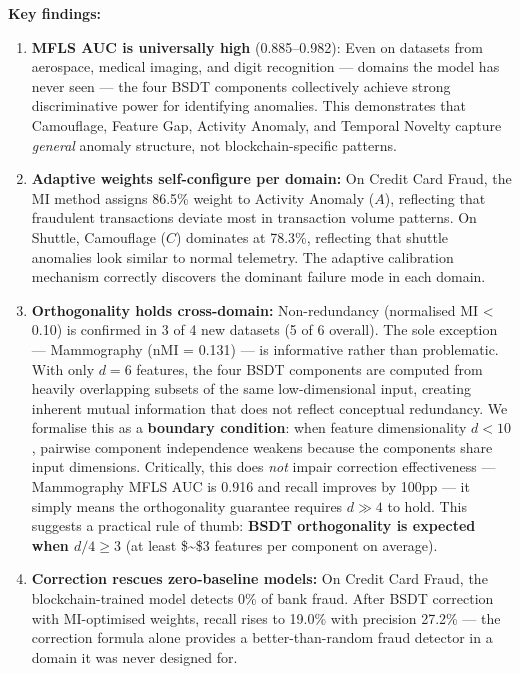 \documentclass[
  11pt,
]{article}
\begin{document}
\textbf{Key findings:}

\begin{enumerate}
\def\labelenumi{\arabic{enumi}.}
\item
  \textbf{MFLS AUC is universally high} (0.885–0.982): Even on datasets
  from aerospace, medical imaging, and digit recognition — domains the
  model has never seen — the four BSDT components collectively achieve
  strong discriminative power for identifying anomalies. This
  demonstrates that Camouflage, Feature Gap, Activity Anomaly, and
  Temporal Novelty capture \emph{general} anomaly structure, not
  blockchain-specific patterns.
\item
  \textbf{Adaptive weights self-configure per domain:} On Credit Card
  Fraud, the MI method assigns 86.5\% weight to Activity Anomaly
  (\(A\)), reflecting that fraudulent transactions deviate most in
  transaction volume patterns. On Shuttle, Camouflage (\(C\)) dominates
  at 78.3\%, reflecting that shuttle anomalies look similar to normal
  telemetry. The adaptive calibration mechanism correctly discovers the
  dominant failure mode in each domain.
\item
  \textbf{Orthogonality holds cross-domain:} Non-redundancy (normalised
  MI \textless{} 0.10) is confirmed in 3 of 4 new datasets (5 of 6
  overall). The sole exception — Mammography (nMI = 0.131) — is
  informative rather than problematic. With only \(d = 6\) features, the
  four BSDT components are computed from heavily overlapping subsets of
  the same low-dimensional input, creating inherent mutual information
  that does not reflect conceptual redundancy. We formalise this as a
  \textbf{boundary condition}: when feature dimensionality \(d < 10\),
  pairwise component independence weakens because the components share
  input dimensions. Critically, this does \emph{not} impair correction
  effectiveness — Mammography MFLS AUC is 0.916 and recall improves by
  100pp — it simply means the orthogonality guarantee requires
  \(d \gg 4\) to hold. This suggests a practical rule of thumb:
  \textbf{BSDT orthogonality is expected when \(d/4 \geq 3\)} (at least
  \$\sim\$3 features per component on average).
\item
  \textbf{Correction rescues zero-baseline models:} On Credit Card
  Fraud, the blockchain-trained model detects 0\% of bank fraud. After
  BSDT correction with MI-optimised weights, recall rises to 19.0\% with
  precision 27.2\% — the correction formula alone provides a
  better-than-random fraud detector in a domain it was never designed
  for.
\end{enumerate}
\end{document}
